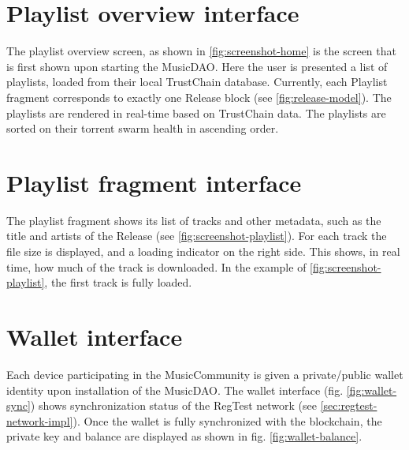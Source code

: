 \section{Playlist overview interface}
The playlist overview screen, as shown in \ref{fig:screenshot-home} is the screen that is first shown upon starting the MusicDAO. Here the user is presented a list of playlists, loaded from their local TrustChain database. Currently, each Playlist fragment corresponds to exactly one Release block (see \ref{fig:release-model}). The playlists are rendered in real-time based on TrustChain data. The playlists are sorted on their torrent swarm health in ascending order. 
\section{Playlist fragment interface}
The playlist fragment shows its list of tracks and other metadata, such as the title and artists of the Release (see \ref{fig:screenshot-playlist}). For each track the file size is displayed, and a loading indicator on the right side. This shows, in real time, how much of the track is downloaded. In the example of \ref{fig:screenshot-playlist}, the first track is fully loaded.
\section{Wallet interface}
Each device participating in the MusicCommunity is given a private/public wallet identity upon installation of the MusicDAO. The wallet interface (fig. \ref{fig:wallet-sync}) shows synchronization status of the RegTest network (see \ref{sec:regtest-network-impl}). Once the wallet is fully synchronized with the blockchain, the private key and balance are displayed as shown in fig. \ref{fig:wallet-balance}. 

